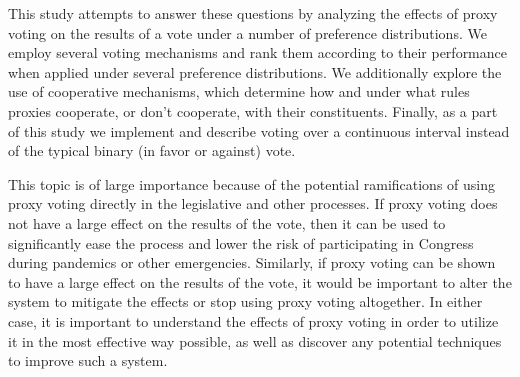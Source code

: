 This study attempts to answer these questions by analyzing the effects of proxy
voting on the results of a vote under a number of preference distributions.
We employ several voting mechanisms and rank them according to their performance when
applied under several preference distributions.
We additionally explore the use of cooperative mechanisms, which determine how and
under what rules proxies cooperate, or don't cooperate, with their constituents.
Finally, as a part of this study we implement and describe voting over a continuous
interval instead of the typical binary (in favor or against) vote.

This topic is of large importance because of the potential ramifications of using
proxy voting directly in the legislative and other processes.
If proxy voting does not have a large effect on the results of the vote, then it
can be used to significantly ease the process and lower the risk of participating in
Congress during pandemics or other emergencies.
Similarly, if proxy voting can be shown to have a large effect on the results of the
vote, it would be important to alter the system to mitigate the effects or stop using
proxy voting altogether.
In either case, it is important to understand the effects of proxy voting in order to
utilize it in the most effective way possible, as well as discover any potential
techniques to improve such a system.









